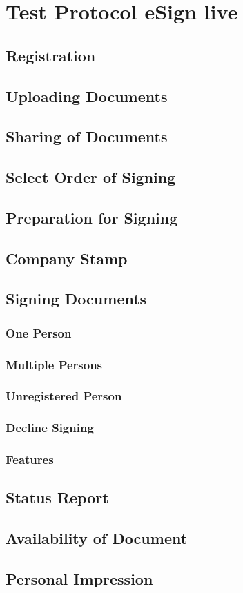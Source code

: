 \section{Test Protocol eSign live}

\subsection{Registration}

\subsection{Uploading Documents}

\subsection{Sharing of Documents}

\subsection{Select Order of Signing}

\subsection{Preparation for Signing}

\subsection{Company Stamp}

\subsection{Signing Documents}

\subsubsection{One Person}

\subsubsection{Multiple Persons}

\subsubsection{Unregistered Person}

\subsubsection{Decline Signing}

\subsubsection{Features}

\subsection{Status Report}

\subsection{Availability of Document}

\subsection{Personal Impression}